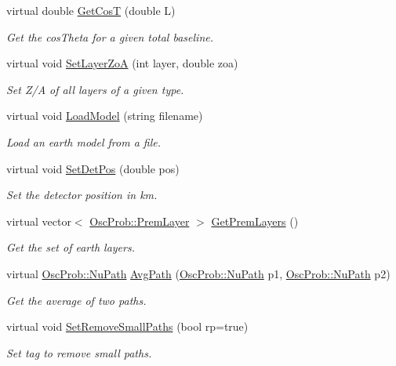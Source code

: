 \begin{DoxyCompactItemize}
virtual double \hyperlink{classOscProb_1_1PremModel_a5328474bdbb703eb4c9d4df49999cda6}{Get\+CosT} (double L)
\begin{DoxyCompactList}\small\item\em Get the cos\+Theta for a given total baseline. \end{DoxyCompactList}\item 
virtual void \hyperlink{classOscProb_1_1PremModel_ac9887d1af4b3c02925fe3228349f593d}{Set\+Layer\+ZoA} (int layer, double zoa)
\begin{DoxyCompactList}\small\item\em Set Z/A of all layers of a given type. \end{DoxyCompactList}\item 
virtual void \hyperlink{classOscProb_1_1PremModel_a893b3ed65afabbdde5a4293339f14629}{Load\+Model} (string filename)
\begin{DoxyCompactList}\small\item\em Load an earth model from a file. \end{DoxyCompactList}\item 
virtual void \hyperlink{classOscProb_1_1PremModel_a55b314e97ed9b92931e08ada0c0947eb}{Set\+Det\+Pos} (double pos)
\begin{DoxyCompactList}\small\item\em Set the detector position in km. \end{DoxyCompactList}\item 
virtual vector$<$ \hyperlink{structOscProb_1_1PremLayer}{Osc\+Prob\+::\+Prem\+Layer} $>$ \hyperlink{classOscProb_1_1PremModel_ae4feeccc7027253f5c2e2493098145ca}{Get\+Prem\+Layers} ()
\begin{DoxyCompactList}\small\item\em Get the set of earth layers. \end{DoxyCompactList}\item 
virtual \hyperlink{structOscProb_1_1NuPath}{Osc\+Prob\+::\+Nu\+Path} \hyperlink{classOscProb_1_1PremModel_a646977424cdca178a77694397146c2f8}{Avg\+Path} (\hyperlink{structOscProb_1_1NuPath}{Osc\+Prob\+::\+Nu\+Path} p1, \hyperlink{structOscProb_1_1NuPath}{Osc\+Prob\+::\+Nu\+Path} p2)
\begin{DoxyCompactList}\small\item\em Get the average of two paths. \end{DoxyCompactList}\item 
virtual void \hyperlink{classOscProb_1_1PremModel_ac5496d6d5bafcf7740c60838d3eee7b3}{Set\+Remove\+Small\+Paths} (bool rp=true)
\begin{DoxyCompactList}\small\item\em Set tag to remove small paths. \end{DoxyCompactList}\end{DoxyCompactItemize}
